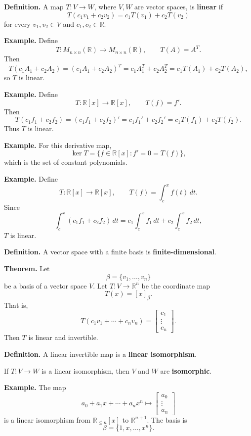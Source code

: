 \documentclass[letterpaper]{article}
\begin{document}
\bigskip

\textbf{Definition.} A map $T:V\to W$, where $V,W$ are vector spaces, is \textbf{linear} if
\[
T(c_1v_1+c_2v_2)=c_1T(v_1)+c_2T(v_2)
\]
for every $v_1,v_2\in V$ and $c_1,c_2\in\mathbb{R}$.

\medskip

\textbf{Example.} Define
\[
T:M_{n\times n}(\mathbb{R})\to M_{n\times n}(\mathbb{R}),
\qquad T(A)=A^T.
\]
Then
\[
T(c_1A_1+c_2A_2)=(c_1A_1+c_2A_2)^T
=c_1A_1^T+c_2A_2^T
=c_1T(A_1)+c_2T(A_2),
\]
so $T$ is linear.

\newpage

\textbf{Example.} Define
\[
T:\mathbb{R}[x]\to\mathbb{R}[x],
\qquad T(f)=f'.
\]
Then
\[
T(c_1f_1+c_2f_2)=(c_1f_1+c_2f_2)'
=c_1f_1'+c_2f_2'
=c_1T(f_1)+c_2T(f_2).
\]
Thus $T$ is linear.

\medskip

\textbf{Example.} For this derivative map,
\[
\ker T=\{f\in\mathbb{R}[x]:f'=0=T(f)\},
\]
which is the set of constant polynomials.

\medskip

\textbf{Example.} Define
\[
T:\mathbb{R}[x]\to\mathbb{R}[x],
\qquad
T(f)=\int_c^x f(t)\,dt.
\]
Since
\[
\int_c^x(c_1f_1+c_2f_2)\,dt
=c_1\int_c^x f_1\,dt+c_2\int_c^x f_2\,dt,
\]
$T$ is linear.

\newpage

\textbf{Definition.} A vector space with a finite basis is \textbf{finite-dimensional}.

\bigskip

\textbf{Theorem.} Let
\[
\beta=\{v_1,\ldots,v_n\}
\]
be a basis of a vector space $V$. Let $T:V\to\mathbb{R}^n$ be the coordinate map
\[
T(x)=[x]_\beta.
\]
That is,
\[
T(c_1v_1+\cdots+c_nv_n)=
\begin{bmatrix}c_1\\ \vdots\\ c_n\end{bmatrix}.
\]
Then $T$ is linear and invertible.

\bigskip

\textbf{Definition.} A linear invertible map is a \textbf{linear isomorphism}.

\medskip

If $T:V\to W$ is a linear isomorphism, then $V$ and $W$ are \textbf{isomorphic}.

\medskip

\textbf{Example.} The map
\[
a_0+a_1x+\cdots+a_nx^n
\longmapsto
\begin{bmatrix}a_0\\ \vdots\\ a_n\end{bmatrix}
\]
is a linear isomorphism from $\mathbb{R}_{\leq n}[x]$ to $\mathbb{R}^{n+1}$. The basis is
\[
\beta=\{1,x,\ldots,x^n\}.
\]
\end{document}
